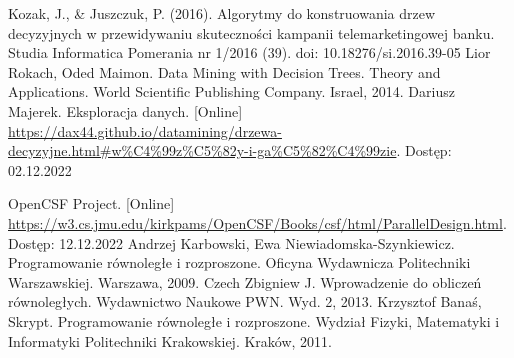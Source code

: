 \documentclass[12pt]{article}
\begin{document}
\lstlistoflistings

\newpage

\cleardoublepage
{}
{}
\begin{thebibliography}{20}

     Kozak, J., \& Juszczuk, P. (2016). Algorytmy do konstruowania drzew decyzyjnych w przewidywaniu skuteczności kampanii telemarketingowej banku. Studia Informatica Pomerania nr 1/2016 (39). doi: 10.18276/si.2016.39-05
     Lior Rokach, Oded Maimon. Data Mining with Decision Trees. Theory and Applications. World Scientific Publishing Company. Israel, 2014.
     Dariusz Majerek. Eksploracja danych. [Online] \url{https://dax44.github.io/datamining/drzewa-decyzyjne.html#w%C4%99z%C5%82y-i-ga%C5%82%C4%99zie}. Dostęp: 02.12.2022
   
     OpenCSF Project. [Online] \url{https://w3.cs.jmu.edu/kirkpams/OpenCSF/Books/csf/html/ParallelDesign.html}. Dostęp: 12.12.2022
     Andrzej Karbowski, Ewa Niewiadomska-Szynkiewicz. Programowanie równoległe i rozproszone. Oficyna Wydawnicza Politechniki Warszawskiej. Warszawa, 2009.
     Czech Zbigniew J. Wprowadzenie do obliczeń równoległych. Wydawnictwo Naukowe PWN. Wyd. 2, 2013.
     Krzysztof Banaś, Skrypt. Programowanie równoległe i rozproszone. Wydział Fizyki, Matematyki i Informatyki Politechniki Krakowskiej. Kraków, 2011.


\end{thebibliography}
\end{document}
